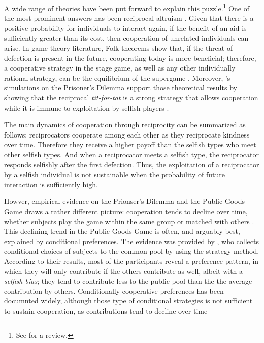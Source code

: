 \documentclass[12pt]{article}
\begin{document}
A wide range of theories have been put forward to explain this puzzle.\footnote{See \citet{Nowak2006, Bowles2011, henrich2021origins} for a review.} One of the most prominent answers has been reciprocal altruism \citep{Trivers1971, Axelrod1981-ot, may1987more, nowak1992tit,Nowak1993-gl}. Given that there is a positive probability for individuals to interact again, if the benefit of an aid is sufficiently greater than its cost, then cooperation of unrelated individuals can arise. In game theory literature, Folk theorems show that, if the threat of defection is present in the future, cooperating today is more beneficial; therefore, a cooperative strategy in the stage game, as well as any other individually rational strategy, can be the equilibrium of the supergame \citep{Friedman1971-nz, Fudenberg1986-dz}. Moreover, \citeauthor{Axelrod1980a}'s simulations on the Prisoner's Dilemma support those theoretical results by showing that the reciprocal \textit{tit-for-tat} is a strong strategy that allows cooperation while it is immune to exploitation by selfish players \citep{Axelrod1980a,Axelrod1980b,Axelrod1981-ot}. 

The main dynamics of cooperation through reciprocity can be summarized as follows: reciprocators cooperate among each other as they reciprocate kindness over time. Therefore they receive a higher payoff than the selfish types who meet other selfish types. And when a reciprocator meets a selfish type, the reciprocator responds selfishly after the first defection. Thus, the exploitation of a reciprocator by a selfish individual is not sustainable when the probability of future interaction is sufficiently high. 

Howver, empirical evidence on the Prionser's Dilemma and the Public Goods Game draws a rather different picture: cooperation tends to decline over time, whether subjects play the game within the same group or matched with others \citep{Selten1986-uc, Andreoni1993-ys, Cooper1996-be, ledyard1994public, Kim1984-wm, Isaac1985-qz, Andreoni2008-ec}. This declining trend in the Public Goods Game is often, and arguably best, explained by conditional preferences. The evidence was provided by \citet{Fischbacher2001}, who collects conditional choices of subjects to the common pool by using the strategy method. According to their results, most of the participants reveal a preference pattern, in which they will only contribute if the others contribute as well, albeit with a \textit{selfish bias}; they tend to contribute less to the public pool than the the average contribution by others. Conditionally cooperative preferences has been documnted widely, although those type of conditional strategies is not sufficient to sustain cooperation, as contributions tend to decline over time \citep{Kocher2008, Herrmann2009, Neugebauer2009, Fischbacher2010, ChaudhuriSustCoopExEc2011, hartig2015conditioning, andreozzi2020stability}
\end{document}
